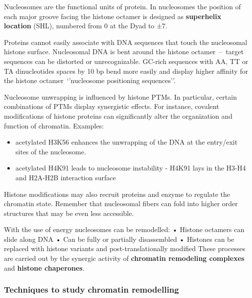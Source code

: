 Nucleosomes are the functional units of protein. In nucleosomes the position of each major groove facing the histone octamer is designed as \textbf{superhelix location} (SHL), numbered from 0 at the Dyad to ±7.

Proteins cannot easily associate with DNA sequences that touch the nucleosomal histone surface. Nucleosomal DNA is bent around the histone octamer~--~target sequences can be distorted or unrecognizable. GC-rich sequences with AA, TT or TA dinucleotides spaces by 10 bp bend more easily and display higher affinity for the histone octamer~`'nucleosome positioning sequences''.

Nucleosome unwrapping is influenced by histone PTMs. In particular, certain combinations of PTMs display synergistic effects. For instance, covalent modifications of histone proteins can significantly alter the organization and function of chromatin. Examples:

\begin{itemize}
\tightlist
\item
  acetylated H3K56 enhances the unwrapping of the DNA at the entry/exit sites of the nucleosome.
\item
  acetylated H4K91 leads to nucleosome instability - H4K91 lays in the H3-H4 and H2A-H2B interaction surface
\end{itemize}

Histone modifications may also recruit proteins and enzyme to regulate the chromatin state. Remember that nucleosomal fibers can fold into higher order structures that may be even less accessible.

With the use of energy nucleosomes can be remodelled:
• Histone octamers can slide along DNA
• Can be fully or partially disassembled
• Histones can be replaced with histone variants and post-translationally modified
These processes are carried out by the synergic activity of \textbf{chromatin remodeling complexes} and \textbf{histone chaperones}.

\hypertarget{techniques-to-study-chromatin-remodelling}{%
\subsubsection{Techniques to study chromatin remodelling}\label{techniques-to-study-chromatin-remodelling}}

